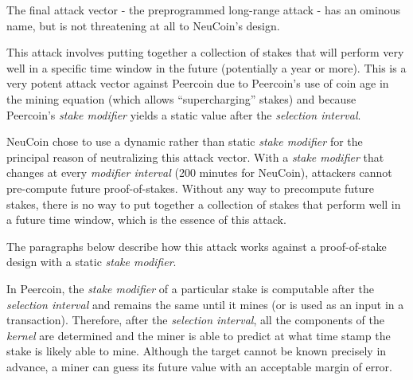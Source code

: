 \documentclass[a4paper,11pt]{article}
\begin{document}
The final attack vector - the preprogrammed long-range attack - has an ominous name, but is not threatening at all to NeuCoin's design.

This attack involves putting together a collection of stakes that will perform very well in a specific time window in the future (potentially a year or more). This is a very potent attack vector against Peercoin due to Peercoin's use of coin age in the mining equation (which allows ``supercharging'' stakes) and because Peercoin's \textit{stake modifier} yields a static value after the \textit{selection interval}. 

NeuCoin chose to use a dynamic rather than static \textit{stake modifier} for the principal reason of neutralizing this attack vector. With a \textit{stake modifier} that changes at every \textit{modifier interval} (200 minutes for NeuCoin), attackers cannot pre-compute future proof-of-stakes. Without any way to precompute future stakes, there is no way to put together a collection of stakes that perform well in a future time window, which is the essence of this attack.

The paragraphs below describe how this attack works against a proof-of-stake design with a static \textit{stake modifier}. 

In Peercoin, the \textit{stake modifier} of a particular stake is computable after the \textit{selection interval} and remains the same until it mines (or is used as an input in a transaction). Therefore, after the \textit{selection interval}, all the components of the \textit{kernel} are determined and the miner is able to predict at what time stamp the stake is likely able to mine. Although the target cannot be known precisely in advance, a miner can guess its future value with an acceptable margin of error.
\end{document}
